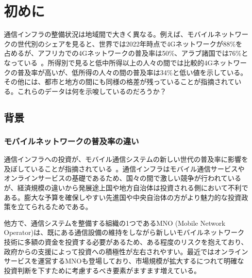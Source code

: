 \section{初めに}
\label{section:初めに}
通信インフラの整備状況は地域間で大きく異なる。例えば、モバイルネットワークの世代別のシェアを見ると、世界では2022年時点で4Gネットワークが88\%を占めるが、アフリカでの4Gネットワークの普及率は50\%、アラブ諸国では76\%となっている~\cite{ITU2022FactsAndFigures}。所得別で見ると低中所得以上の人々の間では比較的4Gネットワークの普及率が高いが、低所得の人々の間の普及率は34\%と低い値を示している。その他には、都市と地方の間にも同様の格差が残っていることが指摘されている。これらのデータは何を示唆しているのだろうか？
\subsection{背景}
\label{subsection:背景}
\subsubsection{モバイルネットワークの普及率の違い}
\label{subsubsection:モバイルネットワークの普及率の違い}
通信インフラへの投資が、モバイル通信システムの新しい世代の普及率に影響を及ぼしていることが指摘されている~\cite{Forge2020FormingA5GStrategyForDevelopingCountries}。通信インフラはモバイル通信サービスやオンラインサービスの基礎であるため、国々の間で激しい競争が行われているが、経済規模の違いから発展途上国や地方自治体は投資される側において不利である。膨大な予算を確保しやすい先進国や中央自治体の方がより魅力的な投資政策を立てられるためである。

他方で、通信システムを整備する組織の1つであるMNO (Mobile Network Operator)は、既にある通信設備の維持をしながら新しいモバイルネットワーク技術に多額の資金を投資する必要があるため、ある程度のリスクを抱えており、政府からの支援によって投資への積極性が左右されやすい。最近ではオンラインサービスを運営するMNOも登場しており、市場規模が拡大するにつれて明確な投資判断を下すために考慮するべき要素がますます増えている。

